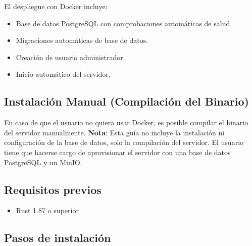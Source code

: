 El despliegue con Docker incluye:
\begin{itemize}
    \item Base de datos PostgreSQL con comprobaciones automáticas de salud.
    \item Migraciones automáticas de base de datos.
    \item Creación de usuario administrador.
    \item Inicio automático del servidor.
\end{itemize}

\subsection{Instalación Manual (Compilación del Binario)}

En caso de que el usuario no quiera usar Docker, es posible compilar el binario del servidor manualmente.  
\textbf{Nota}: Esta guía no incluye la instalación ni configuración de la base de datos, solo la compilación del servidor.
El usuario tiene que hacerse cargo de aprovisionar el servidor con una base de datos PostgreSQL y un MinIO.

\subsection*{Requisitos previos}
\begin{itemize}
    \item Rust 1.87 o superior
\end{itemize}

\subsection*{Pasos de instalación}

